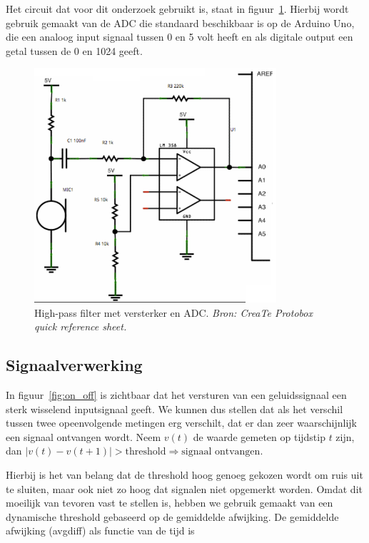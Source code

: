 \documentclass[a4paper,10pt]{article}
\begin{document}
Het circuit dat voor dit onderzoek gebruikt is, staat in figuur~\ref{fig:circuit}. Hierbij wordt gebruik gemaakt van de ADC die standaard beschikbaar is op de Arduino Uno, die een analoog input signaal tussen 0 en 5 volt heeft en als digitale output een getal tussen de 0 en 1024 geeft.

\begin{figure}[ht!]
    \centering
    \includegraphics[width=0.8\textwidth]{high_pass_filter_circuit.png}
    \caption{High-pass filter met versterker en ADC. \textit{Bron: CreaTe Protobox quick reference sheet.}}
    \label{fig:circuit}
\end{figure}


\subsection{Signaalverwerking}
In figuur~\ref{fig:on_off} is zichtbaar dat het versturen van een geluidssignaal een sterk wisselend inputsignaal geeft. We kunnen dus stellen dat als het verschil tussen twee opeenvolgende metingen erg verschilt, dat er dan zeer waarschijnlijk een signaal ontvangen wordt. Neem $v(t)$ de waarde gemeten op tijdstip $t$ zijn, dan $|v(t) - v(t+1)| > \text{threshold} \Rightarrow \text{signaal ontvangen}$.

Hierbij is het van belang dat de threshold hoog genoeg gekozen wordt om ruis uit te sluiten, maar ook niet zo hoog dat signalen niet opgemerkt worden. Omdat dit moeilijk van tevoren vast te stellen is, hebben we gebruik gemaakt van een dynamische threshold gebaseerd op de gemiddelde afwijking. De gemiddelde afwijking (avgdiff) als functie van de tijd is
\end{document}
